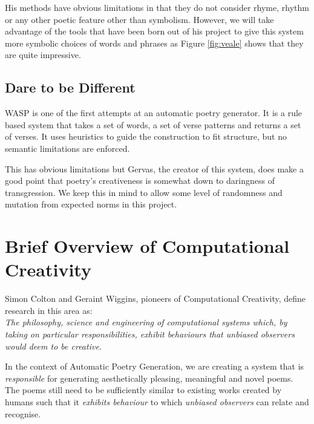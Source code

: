 His methods have obvious limitations in that they do not consider rhyme, rhythm or any other poetic feature other than symbolism. However, we will take advantage of the tools that have been born out of his project to give this system more symbolic choices of words and phrases as Figure \ref{fig:veale} shows that they are quite impressive.

\subsection{Dare to be Different}
WASP is one of the first attempts at an automatic poetry generator. It is a rule based system that takes a set of words, a set of verse patterns and returns a set of verses\cite{gervas2000wasp}. It uses heuristics to guide the construction to fit structure, but no semantic limitations are enforced.

This has obvious limitations but Gervas, the creator of this system, does make a good point that poetry's creativeness is somewhat down to daringness of transgression. We keep this in mind to allow some level of randomness and mutation from expected norms in this project. 


\section{Brief Overview of Computational Creativity}
Simon Colton and Geraint Wiggins, pioneers of Computational Creativity, define research in this area as: \\
\textit{The philosophy, science and engineering of computational systems which, by taking on particular responsibilities, exhibit behaviours that unbiased observers would deem to be creative.}\cite{colton2012computational}

In the context of Automatic Poetry Generation, we are creating a system that is \textit{responsible} for generating aesthetically pleasing, meaningful and novel poems. The poems still need to be sufficiently similar to existing works created by humans such that it \textit{exhibits behaviour} to which \textit{unbiased observers} can relate and recognise.

